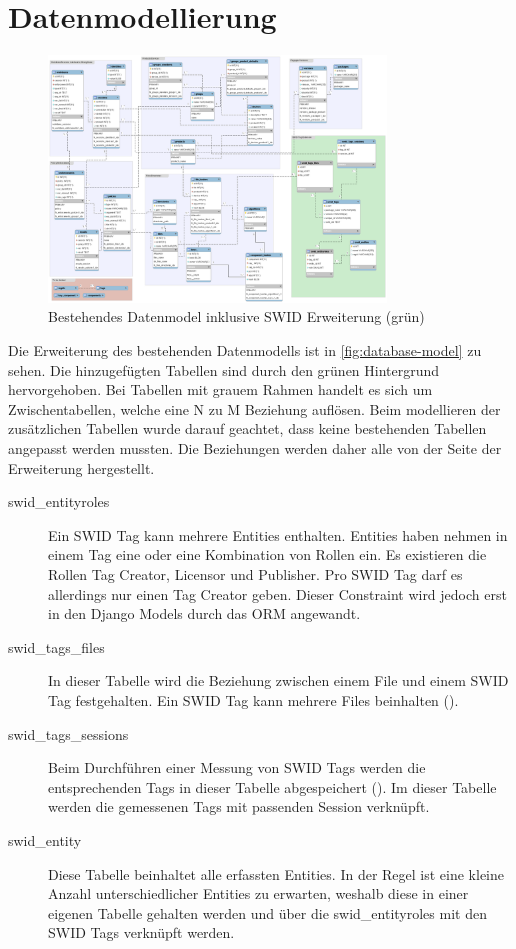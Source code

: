 \section{Datenmodellierung}
\begin{figure}[H]
\centering
\includegraphics[angle=90,width=0.8\textwidth]{./images/db/database-model}
\caption{Bestehendes Datenmodel inklusive SWID Erweiterung (grün)}
\label{fig:database-model}
\end{figure}
Die Erweiterung des bestehenden Datenmodells ist in \autoref{fig:database-model} zu sehen. Die hinzugefügten Tabellen sind durch den grünen Hintergrund hervorgehoben. Bei Tabellen mit grauem Rahmen handelt es sich um Zwischentabellen, welche eine N zu M Beziehung auflösen. Beim modellieren der zusätzlichen Tabellen wurde darauf geachtet, dass keine bestehenden Tabellen angepasst werden mussten. Die Beziehungen werden daher alle von der Seite der Erweiterung hergestellt.
\begin{description}
\item [swid\_entityroles] Ein SWID Tag kann mehrere Entities enthalten. Entities haben nehmen in einem Tag eine oder eine Kombination von Rollen ein. Es existieren die Rollen Tag Creator, Licensor und Publisher. Pro SWID Tag darf es allerdings nur einen Tag Creator geben. Dieser Constraint wird jedoch erst in den Django Models durch das \gls{ORM} angewandt.

\item [swid\_tags\_files] In dieser Tabelle wird die Beziehung zwischen einem File und einem SWID Tag festgehalten. Ein SWID Tag kann mehrere Files beinhalten ().

\item[swid\_tags\_sessions] Beim Durchführen einer Messung von SWID Tags werden die entsprechenden Tags in dieser Tabelle abgespeichert (). Im dieser Tabelle werden die gemessenen Tags mit passenden Session verknüpft.

\item[swid\_entity] 
Diese Tabelle beinhaltet alle erfassten Entities. In der Regel ist eine kleine Anzahl unterschiedlicher Entities zu erwarten, weshalb diese in einer eigenen Tabelle gehalten werden und über die swid\_entityroles mit den SWID Tags verknüpft werden.

\end{description}

